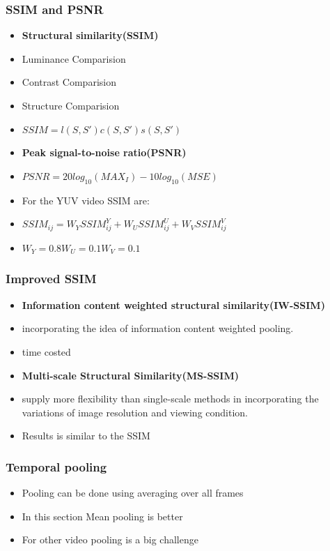 \documentclass{beamer}
\begin{document}
\begin{frame}
\frametitle{SSIM and PSNR}
\begin{itemize}
	\item \textbf{Structural similarity(SSIM)}\itemindent 30pt
    \item Luminance Comparision
    \item Contrast Comparision
    \item Structure Comparision
    \item \(SSIM=l(S,S')c(S,S')s(S,S')\)
\end{itemize}
\begin{itemize}
	\item \textbf{Peak signal-to-noise ratio(PSNR)}\itemindent 30pt
    \item \(PSNR=20log_{10}(MAX_I)-10log_{10}(MSE)\)
\end{itemize}
\begin{itemize}
\item For the YUV video SSIM are:
\item \(SSIM_{ij}=W_YSSIM_{ij}^Y+W_USSIM_{ij}^U+W_VSSIM_{ij}^V\)
\item \(W_Y=0.8 W_U=0.1 W_V=0.1\) 
\end{itemize}

\end{frame}

\begin{frame}
\frametitle{Improved SSIM}
\begin{itemize}
	\item \textbf{Information content weighted structural similarity(IW-SSIM)}
    \item incorporating the idea of information content weighted pooling. 
    \item time costed
\end{itemize}
\begin{itemize}
	\item \textbf{Multi-scale Structural Similarity(MS-SSIM)}
    \item supply more flexibility than single-scale methods in incorporating the variations of image resolution and viewing condition.
    \item Results is similar to the SSIM
\end{itemize}
\end{frame} 


\begin{frame}
\frametitle{Temporal pooling}
\begin{itemize}
	\item Pooling can be done using averaging over all frames 
	\item In this section Mean pooling is better
    \item For other video pooling is a big challenge
\end{itemize}
\end{frame} 
\end{document}

